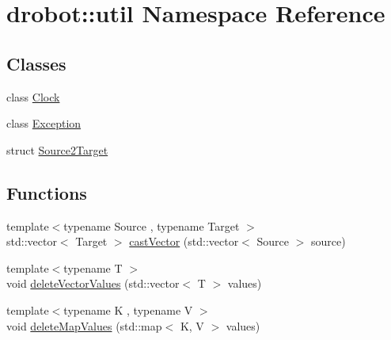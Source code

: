 \hypertarget{namespacedrobot_1_1util}{\section{drobot\-:\-:util Namespace Reference}
\label{namespacedrobot_1_1util}
}
\subsection*{Classes}
\begin{DoxyCompactItemize}
\item 
class \hyperlink{classdrobot_1_1util_1_1Clock}{Clock}
\item 
class \hyperlink{classdrobot_1_1util_1_1Exception}{Exception}
\item 
struct \hyperlink{structdrobot_1_1util_1_1Source2Target}{Source2\-Target}
\end{DoxyCompactItemize}
\subsection*{Functions}
\begin{DoxyCompactItemize}
\item 
{\footnotesize template$<$typename Source , typename Target $>$ }\\std\-::vector$<$ Target $>$ \hyperlink{namespacedrobot_1_1util_ae157ae76bb306544a706e123e1330cde}{cast\-Vector} (std\-::vector$<$ Source $>$ source)
\item 
{\footnotesize template$<$typename T $>$ }\\void \hyperlink{namespacedrobot_1_1util_a3ff8a5d110a3cabffd78590ef18844a4}{delete\-Vector\-Values} (std\-::vector$<$ T $>$ values)
\item 
{\footnotesize template$<$typename K , typename V $>$ }\\void \hyperlink{namespacedrobot_1_1util_a17d0014bd5004703c6cec5c9c77956a5}{delete\-Map\-Values} (std\-::map$<$ K, V $>$ values)
\end{DoxyCompactItemize}



